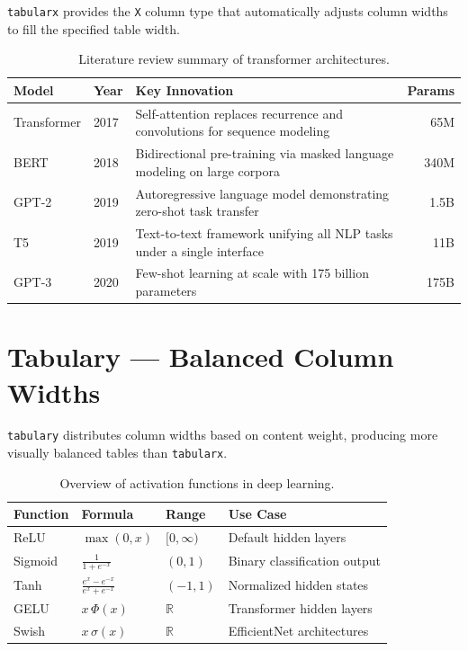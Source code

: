 \documentclass[
    language=english,
    doctype=article,
    institution=none,
]{../../omnilatex}
\begin{document}
\texttt{tabularx} provides the \texttt{X} column type that automatically adjusts
column widths to fill the specified table width.

\begin{table}[htbp]
    \centering
    \caption{Literature review summary of transformer architectures.}
    \label{tab:tabularx}
    \begin{tabularx}{\textwidth}{l l X r}
        \toprule
        \textbf{Model} & \textbf{Year} & \textbf{Key Innovation} & \textbf{Params} \\
        \midrule
        Transformer     & 2017 & Self-attention replaces recurrence and convolutions for sequence modeling & 65M \\
        BERT            & 2018 & Bidirectional pre-training via masked language modeling on large corpora & 340M \\
        GPT-2           & 2019 & Autoregressive language model demonstrating zero-shot task transfer & 1.5B \\
        T5              & 2019 & Text-to-text framework unifying all NLP tasks under a single interface & 11B \\
        GPT-3           & 2020 & Few-shot learning at scale with 175 billion parameters & 175B \\
        \bottomrule
    \end{tabularx}
\end{table}

\section{Tabulary — Balanced Column Widths}
\label{sec:tabulary}

\texttt{tabulary} distributes column widths based on content weight, producing
more visually balanced tables than \texttt{tabularx}.

\begin{table}[htbp]
    \centering
    \caption{Overview of activation functions in deep learning.}
    \label{tab:tabulary}
    \begin{tabulary}{\textwidth}{L L L L}
        \toprule
        \textbf{Function} & \textbf{Formula} & \textbf{Range} & \textbf{Use Case} \\
        \midrule
        ReLU    & $\max(0, x)$    & $[0, \infty)$ & Default hidden layers \\
        Sigmoid & $\frac{1}{1+e^{-x}}$ & $(0, 1)$ & Binary classification output \\
        Tanh    & $\frac{e^x - e^{-x}}{e^x + e^{-x}}$ & $(-1, 1)$ & Normalized hidden states \\
        GELU    & $x\,\Phi(x)$    & $\mathbb{R}$ & Transformer hidden layers \\
        Swish   & $x\,\sigma(x)$  & $\mathbb{R}$ & EfficientNet architectures \\
        \bottomrule
    \end{tabulary}
\end{table}
\end{document}
